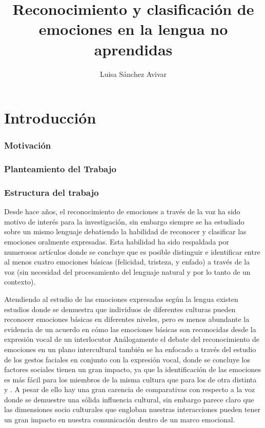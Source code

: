 \documentclass[11pt,a4paper,spanish]{book}
\begin{document}
	\title{Reconocimiento y clasificación de emociones en la lengua no aprendidas}
	\author{Luisa Sánchez Avivar}
	
	
	\mainmatter
	\chapter{Introducción}
	
	\subsection{Motivación}
	\subsection{Planteamiento del Trabajo}
	\subsection{Estructura del trabajo}
	
	Desde hace años, el reconocimiento de emociones a través de la voz ha sido motivo de interés para la investigación, sin embargo siempre se ha estudiado sobre un mismo lenguaje debatiendo la habilidad de reconocer y clasificar las emociones oralmente expresadas. Esta habilidad ha sido respaldada por numerosos artículos donde se concluye que es posible distinguir e identificar entre al menos cuatro emociones básicas (felicidad, tristeza, y enfado) a través de la voz (sin necesidad del procesamiento del lenguaje natural y por lo tanto de un contexto).
	
	Atendiendo al estudio de las emociones expresadas según la lengua existen estudios donde se demuestra que individuos de diferentes culturas pueden reconocer emociones básicas en diferentes niveles, pero es menos abundante la evidencia de un acuerdo en cómo las emociones básicas son reconocidas desde la expresión vocal de un interlocutor \cite{Pell2009a}
	Análogamente el debate del reconocimiento de emociones en un plano intercultural también se ha enfocado a través del estudio de los gestos faciales en conjunto con la expresión vocal, donde se concluye los factores sociales tienen un gran impacto, ya que la identificación de las emociones es más fácil para los miembros de la misma cultura que para los de otra distinta \cite{Pell2009a} y \cite{Pell2009}. A pesar de ello hay una gran carencia de comparativas con respecto a la voz donde se demuestre una sólida influencia cultural, sin embargo parece claro que las dimensiones socio culturales que engloban nuestras interacciones pueden tener un gran impacto en nuestra comunicación dentro de un marco emocional.
	
\end{document}
